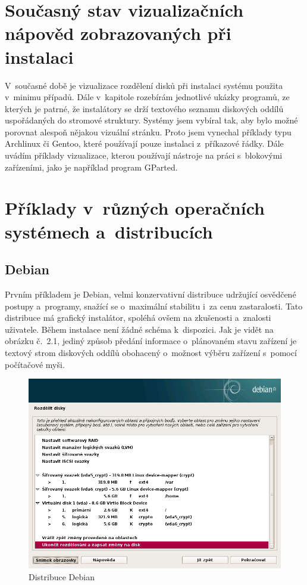 \documentclass[color,table,oneside,nolot,nolof]{fithesis}
\begin{document}
\section{Současný stav vizualizačních nápověd zobrazovaných při instalaci}
	V~současné době je vizualizace rozdělení disků při instalaci systému použita v~minimu případů. Dále v~kapitole rozebírám jednotlivé ukázky programů, ze kterých je patrné, 
	že instalátory se drží textového seznamu diskových oddílů uspořádaných do stromové struktury. Systémy jsem vybíral tak, aby bylo možné porovnat alespoň nějakou vizuální stránku. Proto jsem vynechal
	příklady typu Archlinux či Gentoo, které používají pouze instalaci z~příkazové řádky.  Dále uvádím příklady vizualizace, kterou používají nástroje na práci s~blokovými zařízeními, 
	jako je například program GParted.

\section{Příklady v~různých operačních systémech a~distribucích}

\subsection{Debian}

	Prvním příkladem je Debian, velmi konzervativní distribuce udržující osvědčené postupy a~programy, snažící se o~maximální stabilitu i~za cenu zastaralosti. 
	Tato distribuce má grafický instalátor, spoléhá ovšem na zkušenosti a~znalosti uživatele. Během instalace není žádné schéma k~dispozici. Jak je vidět na obrázku č.~2.1, jediný způsob předání 
	informace o~plánovaném stavu zařízení je textový strom diskových oddílů obohacený o~možnost výběru zařízení s~pomocí počítačové myši.

\begin{figure}[h!]
	\caption{Distribuce Debian}
	\centering
	\includegraphics[width=.8\columnwidth]{pictures/debian1.png}
\end{figure}
\end{document}
